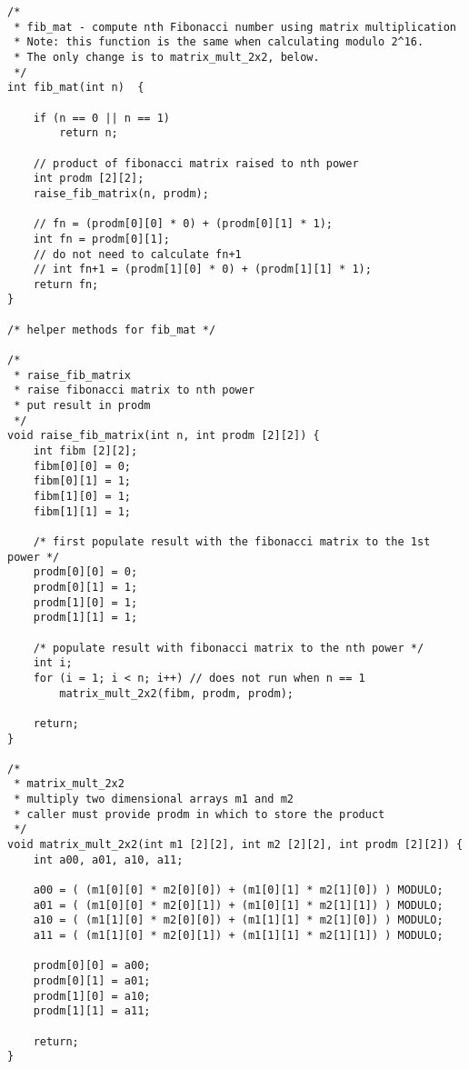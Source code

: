 \documentclass[11pt]{article}
\begin{document}
\begin{verbatim}
/*
 * fib_mat - compute nth Fibonacci number using matrix multiplication
 * Note: this function is the same when calculating modulo 2^16.
 * The only change is to matrix_mult_2x2, below.
 */
int fib_mat(int n)  {

    if (n == 0 || n == 1)
        return n;

    // product of fibonacci matrix raised to nth power
    int prodm [2][2];
    raise_fib_matrix(n, prodm);

    // fn = (prodm[0][0] * 0) + (prodm[0][1] * 1);
    int fn = prodm[0][1];
    // do not need to calculate fn+1
    // int fn+1 = (prodm[1][0] * 0) + (prodm[1][1] * 1);
    return fn;
}

/* helper methods for fib_mat */

/* 
 * raise_fib_matrix
 * raise fibonacci matrix to nth power
 * put result in prodm
 */
void raise_fib_matrix(int n, int prodm [2][2]) {
    int fibm [2][2];
    fibm[0][0] = 0;
    fibm[0][1] = 1;
    fibm[1][0] = 1;
    fibm[1][1] = 1;

    /* first populate result with the fibonacci matrix to the 1st power */
    prodm[0][0] = 0;
    prodm[0][1] = 1;
    prodm[1][0] = 1;
    prodm[1][1] = 1;

    /* populate result with fibonacci matrix to the nth power */
    int i;
    for (i = 1; i < n; i++) // does not run when n == 1
        matrix_mult_2x2(fibm, prodm, prodm);

    return;
}

/*
 * matrix_mult_2x2
 * multiply two dimensional arrays m1 and m2 
 * caller must provide prodm in which to store the product
 */
void matrix_mult_2x2(int m1 [2][2], int m2 [2][2], int prodm [2][2]) {
    int a00, a01, a10, a11;
    
    a00 = ( (m1[0][0] * m2[0][0]) + (m1[0][1] * m2[1][0]) ) MODULO;
    a01 = ( (m1[0][0] * m2[0][1]) + (m1[0][1] * m2[1][1]) ) MODULO;
    a10 = ( (m1[1][0] * m2[0][0]) + (m1[1][1] * m2[1][0]) ) MODULO;
    a11 = ( (m1[1][0] * m2[0][1]) + (m1[1][1] * m2[1][1]) ) MODULO;

    prodm[0][0] = a00;
    prodm[0][1] = a01;
    prodm[1][0] = a10;
    prodm[1][1] = a11;

    return;
}

\end{verbatim}
\end{document}
